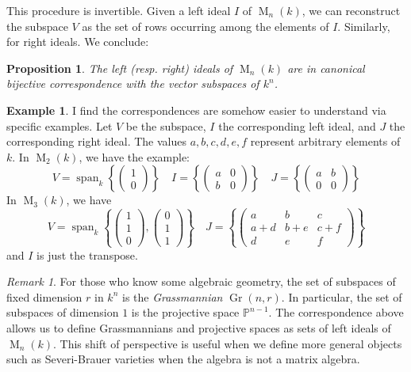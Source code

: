 \documentclass[12pt]{article}
\theoremstyle{plain}
\newtheorem{proposition}[theorem]{Proposition}
\theoremstyle{definition}
\newtheorem{example}[theorem]{Example}
\theoremstyle{remark}
\newtheorem{remark}[theorem]{Remark}
\numberwithin{equation}{section}
\begin{document}
This procedure is invertible.
Given a left ideal $I$ of $\operatorname{M}_n(k)$,
we can reconstruct the subspace $V$
as the set of rows occurring among the elements of $I$.
Similarly, for right ideals.  We conclude:

\begin{proposition}
The left (resp. right) ideals of $\operatorname{M}_n(k)$ are
in canonical bijective correspondence with the vector subspaces of $k^n$.
\end{proposition}

\begin{example}
I find the correspondences are somehow easier to understand
via specific examples.  Let $V$ be the subspace,
$I$ the corresponding left ideal, and $J$ the corresponding right ideal.
The values $a,b,c,d,e,f$ represent arbitrary elements of $k$.
In $\operatorname{M}_2(k)$, we have the example:
\[
V = \operatorname{span}_k \left\{
\begin{pmatrix} 1 \\ 0 \end{pmatrix} \right\}
\quad
I = \left\{ \begin{pmatrix} a & 0 \\ b & 0 \end{pmatrix} \right\} 
\quad
J = \left\{ \begin{pmatrix} a & b \\ 0 & 0 \end{pmatrix} \right\}
\]
In $\operatorname{M}_3(k)$, we have
\[
V = \operatorname{span}_k \left\{
\begin{pmatrix} 1 \\ 1 \\ 0 \end{pmatrix},
\begin{pmatrix} 0 \\ 1 \\ 1 \end{pmatrix} \right\}
\quad
J = \left\{ \begin{pmatrix}
a & b & c \\
a+d & b+e & c+f \\
d & e & f
\end{pmatrix} \right\}
\]
and $I$ is just the transpose.
\end{example}

\begin{remark}
For those who know some algebraic geometry,
the set of subspaces of fixed dimension $r$ in $k^n$ is the
\emph{Grassmannian} $\operatorname{Gr}(n,r)$.
In particular, the set of subspaces of dimension $1$ is the projective
space $\mathbb{P}^{n-1}$.
The correspondence above allows us to define Grassmannians and
projective spaces as sets of left ideals of $\operatorname{M}_n(k)$.
This shift of perspective is useful when we define more general objects
such as Severi-Brauer varieties when the algebra is not a matrix
algebra.
\end{remark}
\end{document}
